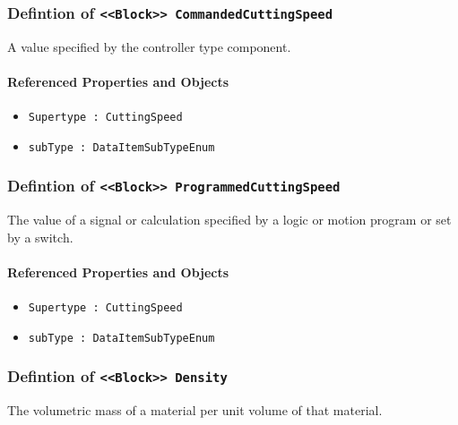 \subsubsection{Defintion of \texttt{<<Block>> CommandedCuttingSpeed}}
  \label{type:CommandedCuttingSpeed}

\FloatBarrier

A value specified by the controller type component.

\FloatBarrier
\paragraph{Referenced Properties and Objects}

\begin{itemize}
\item \texttt{Supertype : CuttingSpeed}

\item \texttt{subType : DataItemSubTypeEnum}

\end{itemize}
\FloatBarrier
\subsubsection{Defintion of \texttt{<<Block>> ProgrammedCuttingSpeed}}
  \label{type:ProgrammedCuttingSpeed}

\FloatBarrier

The value of a signal or calculation specified by a logic or motion program or set by a switch.

\FloatBarrier
\paragraph{Referenced Properties and Objects}

\begin{itemize}
\item \texttt{Supertype : CuttingSpeed}

\item \texttt{subType : DataItemSubTypeEnum}

\end{itemize}
\FloatBarrier
\subsubsection{Defintion of \texttt{<<Block>> Density}}
  \label{type:Density}

\FloatBarrier

The volumetric mass of a material per unit volume of that material.

